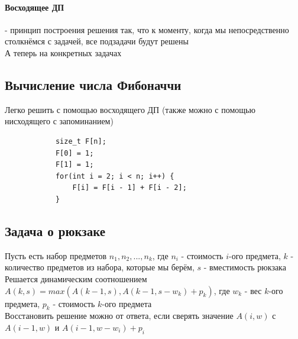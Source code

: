 \documentclass[a4paper,10pt]{article}
\begin{document}
\paragraph{Восходящее ДП} - принцип построения решения так, что к моменту, когда мы непосредственно столкнёмся с задачей, все подзадачи будут решены \\
А теперь на конкретных задачах
\subsection{Вычисление числа Фибоначчи}
Легко решить с помощью восходящего ДП (также можно с помощью нисходящего с запоминанием) \\
\begin{center}
		\begin{lstlisting}
			size_t F[n];
			F[0] = 1;
			F[1] = 1;
			for(int i = 2; i < n; i++) {
				F[i] = F[i - 1] + F[i - 2];
			}
		\end{lstlisting}
\end{center}
\subsection{Задача о рюкзаке}
Пусть есть набор предметов ${n_1, n_2,...,n_k}$, где $n_i$ - стоимость $i$-ого предмета, $k$ - количество предметов из набора, которые мы берём, $s$ - вместимость рюкзака \\
Решается динамическим соотношением $A(k, s) = max(A(k-1, s), A(k-1,s-w_k) + p_k)$, где $w_k$ - вес $k$-ого предмета, $p_k$ - стоимость $k$-ого предмета \\
Восстановить решение можно от ответа, если сверять значение $A(i,w)$ с $A(i-1,w)$ и $A(i-1, w-w_i) + p_i$ \\
\end{document}
